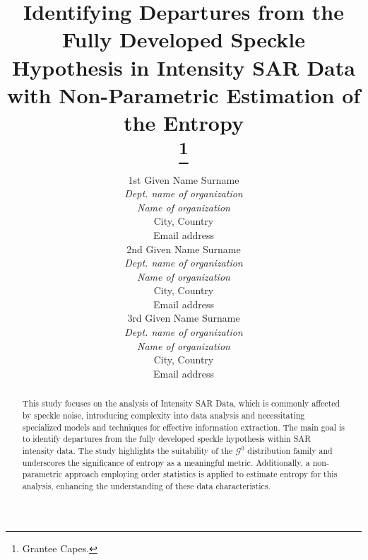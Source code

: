 \documentclass[conference]{IEEEtran}
\begin{document}
\title{Identifying Departures from the Fully Developed Speckle Hypothesis in Intensity SAR Data with Non-Parametric Estimation of the Entropy\\

\thanks{Grantee Capes.}
}

\author{
\begin{minipage}[t]{0.3\textwidth}
\centering
1st Given Name Surname \\
\textit{Dept. name of organization } \\
\textit{Name of organization }\\
City, Country \\
Email address 
\end{minipage}%
\begin{minipage}[t]{0.3\textwidth}
\centering
2nd  Given Name Surname \\
\textit{Dept. name of organization } \\
\textit{Name of organization }\\
City, Country \\
Email address 
\end{minipage}%
\begin{minipage}[t]{0.3\textwidth}
\centering
3rd Given Name Surname \\
\textit{Dept. name of organization } \\
\textit{Name of organization }\\
City, Country \\
Email address 
\end{minipage}
}

\maketitle\begin{abstract}
This study focuses on the analysis of Intensity SAR Data, which is commonly affected by speckle noise, introducing complexity into data analysis and necessitating specialized models and techniques for effective information extraction. 
The main goal is to identify departures from the fully developed speckle hypothesis within SAR intensity data. 
The study highlights the suitability of the $\mathcal{G}^0$ distribution family and underscores the significance of entropy as a meaningful metric. 
Additionally, a non-parametric approach employing order statistics is applied to estimate entropy for this analysis, enhancing the understanding of these data characteristics.
\end{abstract}
\end{document}
